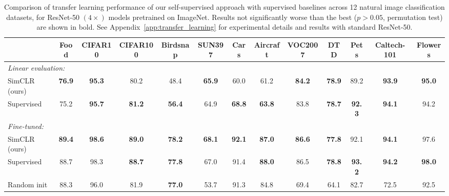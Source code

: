 \documentclass{article}
\begin{document}
\begin{table}[tb]
\footnotesize
\centering
\setlength{\tabcolsep}{3pt}
\begin{tabular}{lcccccccccccc}
\toprule
{} &  Food &  CIFAR10 &  CIFAR100 &  Birdsnap &  SUN397 &  Cars &  Aircraft &  VOC2007 &  DTD &  Pets &  Caltech-101 &  Flowers \\
\midrule
\multicolumn{5}{l}{\textit{Linear evaluation:}}\\
SimCLR (ours) &     \textbf{76.9} &     \textbf{95.3} &      80.2 &      48.4 &    \textbf{65.9} &           60.0 &           61.2 &     \textbf{84.2} &        \textbf{78.9} &         89.2 &               \textbf{93.9} &               \textbf{95.0} \\
Supervised &     75.2 &     \textbf{95.7} &      \textbf{81.2} &      \textbf{56.4} &    64.9 &           \textbf{68.8} &           \textbf{63.8} &     83.8 &        \textbf{78.7} &         \textbf{92.3} &               \textbf{94.1} &               94.2 \\
\midrule
\multicolumn{5}{l}{\textit{Fine-tuned:}}\\
SimCLR (ours) &     \textbf{89.4} &     \textbf{98.6} &      \textbf{89.0} &      \textbf{78.2} &    \textbf{68.1} &           \textbf{92.1} &           \textbf{87.0} &     \textbf{86.6} &        \textbf{77.8} &         92.1 &               \textbf{94.1} &               97.6 \\
Supervised &     88.7 &     98.3 &      \textbf{88.7} &      \textbf{77.8} &    67.0 &           91.4 &           \textbf{88.0} &     86.5 &        \textbf{78.8} &         \textbf{93.2} &               \textbf{94.2} &               \textbf{98.0} \\
Random init &     88.3 &     96.0 &      81.9 &      \textbf{77.0} &    53.7 &           91.3 &           84.8 &     69.4 &        64.1 &         82.7 &               72.5 &               92.5 \\

\bottomrule
\end{tabular}
\caption{Comparison of transfer learning performance of our self-supervised approach with supervised baselines across 12 natural image classification datasets, for ResNet-50 $(4\times)$ models pretrained on ImageNet. Results not significantly worse than the best ($p > 0.05$, permutation test) are shown in bold. See Appendix~\ref{app:transfer_learning} for experimental details and results with standard ResNet-50.}
\label{tab:transfer_learning_resnet_4x}
\end{table}
\end{document}

